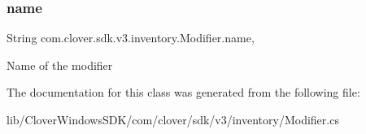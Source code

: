 \subsubsection{\texorpdfstring{name}{name}}
{\footnotesize\ttfamily String com.\+clover.\+sdk.\+v3.\+inventory.\+Modifier.\+name\hspace{0.3cm}{\ttfamily [get]}, {\ttfamily [set]}}



Name of the modifier 



The documentation for this class was generated from the following file\+:\begin{DoxyCompactItemize}
\item 
lib/\+Clover\+Windows\+S\+D\+K/com/clover/sdk/v3/inventory/Modifier.\+cs\end{DoxyCompactItemize}
